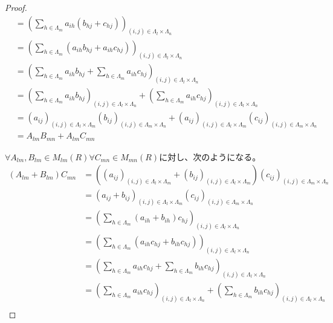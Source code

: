 \documentclass[dvipdfmx]{jsarticle}
\begin{document}
\begin{proof}
\begin{align*}
&= \left( \sum_{h \in \varLambda_{m}} {a_{ih}\left( b_{hj} + c_{hj} \right)} \right)_{(i,j) \in \varLambda_{l} \times \varLambda_{n}}\\
&= \left( \sum_{h \in \varLambda_{m}} \left( a_{ih}b_{hj} + a_{ih}c_{hj} \right) \right)_{(i,j) \in \varLambda_{l} \times \varLambda_{n}}\\
&= \left( \sum_{h \in \varLambda_{m}} {a_{ih}b_{hj}} + \sum_{h \in \varLambda_{m}} {a_{ih}c_{hj}} \right)_{(i,j) \in \varLambda_{l} \times \varLambda_{n}}\\
&= \left( \sum_{h \in \varLambda_{m}} {a_{ih}b_{hj}} \right)_{(i,j) \in \varLambda_{l} \times \varLambda_{n}} + \left( \sum_{h \in \varLambda_{m}} {a_{ih}c_{hj}} \right)_{(i,j) \in \varLambda_{l} \times \varLambda_{n}}\\
&= \left( a_{ij} \right)_{(i,j) \in \varLambda_{l} \times \varLambda_{m}}\left( b_{ij} \right)_{(i,j) \in \varLambda_{m} \times \varLambda_{n}} + \left( a_{ij} \right)_{(i,j) \in \varLambda_{l} \times \varLambda_{m}}\left( c_{ij} \right)_{(i,j) \in \varLambda_{m} \times \varLambda_{n}}\\
&= A_{lm}B_{mn} + A_{lm}C_{mn}
\end{align*}\par
$\forall A_{lm},B_{lm} \in M_{lm}(R)\forall C_{mn} \in M_{mn}(R)$に対し、次のようになる。
\begin{align*}
\left( A_{lm} + B_{lm} \right)C_{mn} &= \left( \left( a_{ij} \right)_{(i,j) \in \varLambda_{l} \times \varLambda_{m}} + \left( b_{ij} \right)_{(i,j) \in \varLambda_{l} \times \varLambda_{m}} \right)\left( c_{ij} \right)_{(i,j) \in \varLambda_{m} \times \varLambda_{n}}\\
&= \left( a_{ij} + b_{ij} \right)_{(i,j) \in \varLambda_{l} \times \varLambda_{m}}\left( c_{ij} \right)_{(i,j) \in \varLambda_{m} \times \varLambda_{n}}\\
&= \left( \sum_{h \in \varLambda_{m}} {\left( a_{ih} + b_{ih} \right)c_{hj}} \right)_{(i,j) \in \varLambda_{l} \times \varLambda_{n}}\\
&= \left( \sum_{h \in \varLambda_{m}} \left( a_{ih}c_{hj} + b_{ih}c_{hj} \right) \right)_{(i,j) \in \varLambda_{l} \times \varLambda_{n}}\\
&= \left( \sum_{h \in \varLambda_{m}} {a_{ih}c_{hj}} + \sum_{h \in \varLambda_{m}} {b_{ih}c_{hj}} \right)_{(i,j) \in \varLambda_{l} \times \varLambda_{n}}\\
&= \left( \sum_{h \in \varLambda_{m}} {a_{ih}c_{hj}} \right)_{(i,j) \in \varLambda_{l} \times \varLambda_{n}} + \left( \sum_{h \in \varLambda_{m}} {b_{ih}c_{hj}} \right)_{(i,j) \in \varLambda_{l} \times \varLambda_{n}}\\

\end{align*}
\end{proof}
\end{document}
